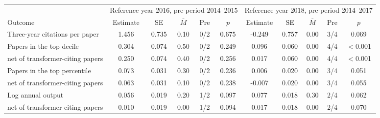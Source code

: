 \begin{tabular}{lccccc|ccccc}
\toprule
 & \multicolumn{5}{c|}{Reference year 2016, pre-period 2014--2015} & \multicolumn{5}{c}{Reference year 2018, pre-period 2014--2017} \\
Outcome & Estimate & SE & $\bar{M}$ & Pre & $p$ & Estimate & SE & $\bar{M}$ & Pre & $p$ \\
\midrule
Three-year citations per paper & 1.456 & 0.735 & 0.10 & 0/2 & 0.675 & -0.249 & 0.757 & 0.00 & 3/4 & 0.069 \\
Papers in the top decile & 0.304 & 0.074 & 0.50 & 0/2 & 0.249 & 0.096 & 0.060 & 0.00 & 4/4 & $<$0.001 \\
\;\;net of transformer-citing papers & 0.250 & 0.074 & 0.40 & 0/2 & 0.256 & 0.017 & 0.060 & 0.00 & 4/4 & $<$0.001 \\
Papers in the top percentile & 0.073 & 0.031 & 0.30 & 0/2 & 0.236 & 0.006 & 0.020 & 0.00 & 3/4 & 0.051 \\
\;\;net of transformer-citing papers & 0.063 & 0.031 & 0.10 & 0/2 & 0.238 & -0.007 & 0.020 & 0.00 & 3/4 & 0.055 \\
Log annual output & 0.056 & 0.019 & 0.20 & 1/2 & 0.097 & 0.077 & 0.018 & 0.30 & 2/4 & 0.062 \\
\;\;net of transformer-citing papers & 0.010 & 0.019 & 0.00 & 1/2 & 0.094 & 0.017 & 0.018 & 0.00 & 2/4 & 0.070 \\
\bottomrule
\end{tabular}
